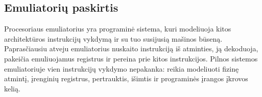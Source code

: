 \subsection{Emuliatorių paskirtis}
\label{subsec:emuliatoriu-paskirtis}

Procesoriaus emuliatorius yra programinė sistema, kuri modeliuoja kitos architektūros instrukcijų vykdymą ir su tuo susijusią mašinos būseną. Paprasčiausiu atveju emuliatorius nuskaito instrukciją iš atminties, ją dekoduoja, pakeičia emuliuojamus registrus ir pereina prie kitos instrukcijos. Pilnos sistemos emuliatoriuje vien instrukcijų vykdymo nepakanka: reikia modeliuoti fizinę atmintį, įrenginių registrus, pertrauktis, išimtis ir programinės įrangos įkrovos kelią.
